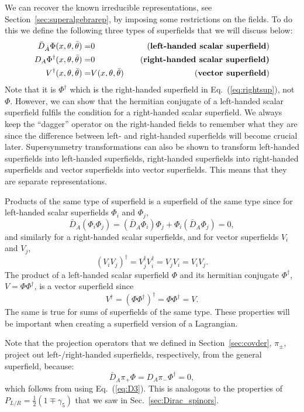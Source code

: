 \documentclass[notes.tex]{subfiles}
\begin{document}
We can recover the known irreducible representations, see Section~\ref{sec:superalgebrarep}, by imposing some restrictions on the fields. To do this we define the following three types of superfields that we will discuss below:
\begin{eqnarray}
\bar{D}_{\dot{A}}\Phi(x, \theta, \bar{\theta}) =& 0 &\quad\text{({\bf left-handed scalar superfield})}\label{eq:leftsup}\\
D_{A}\Phi^\dagger (x, \theta, \bar{\theta}) =& 0 &\quad\text{(\bf{right-handed scalar superfield})}\label{eq:rightsup}\\
V^\dagger (x, \theta, \bar{\theta}) =& V(x, \theta, \bar{\theta}) &\quad\text{({\bf vector superfield})}
\end{eqnarray}
Note that it is $\Phi^\dagger$ which is the right-handed superfield in Eq.~(\ref{eq:rightsup}), not $\Phi$. However, we can show that the hermitian conjugate of a left-handed scalar superfield fulfils the condition for a right-handed scalar superfield. We always keep the ``dagger'' operator on the right-handed fields to remember what they are since the difference between left- and right-handed superfields will become crucial later. Supersymmetry transformations can also be shown to transform left-handed superfields into left-handed superfields, right-handed superfields into right-handed superfields and vector superfields into vector superfields. This means that they are separate representations.

Products of the same type of superfield is a superfield of the same type since for left-handed scalar superfields $\Phi_i$ and $\Phi_j$,
\[ \bar{D}_{\dot{A}}(\Phi_i\Phi_j) = (\bar{D}_{\dot{A}}\Phi_i)\Phi_j +\Phi_i( \bar{D}_{\dot{A}}\Phi_j)=0,\]
and similarly for a right-handed scalar superfields, and for vector superfields $V_i$ and $V_j$,
\[(V_iV_j)^\dagger=V_j^\dagger V_i^\dagger=V_j V_i= V_iV_j.\]
The product of a left-handed scalar superfield $\Phi$ and its hermitian conjugate $\Phi^\dagger$, $V=\Phi \Phi^\dagger$, is a vector superfield since
\[V^\dagger=(\Phi \Phi^\dagger)^\dagger=\Phi \Phi^\dagger=V.\]
The same is true for sums of superfields of the same type. These properties will be important when creating a superfield version of a Lagrangian.

Note that the projection operators that we defined in Section~\ref{sec:covder}, $\pi_\pm$, project out left-/right-handed superfields, respectively,  from the general superfield, because:
\[\bar{D}_{\dot{A}}\pi_+\Phi = D_A \pi_- \Phi^\dagger = 0, \]
which follows from using Eq.~(\ref{eq:D3}). This is analogous to the properties of $P_{L/R} = \frac{1}{2}(1\mp \gamma_5)$ that we saw in Sec.~\ref{sec:Dirac_spinors}.
\end{document}
